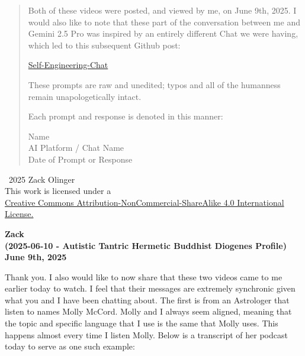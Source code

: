 \documentclass{article}
\newcommand{\licenseURL}{https://creativecommons.org/licenses/by-nc-sa/4.0/legalcode.txt}
\begin{document}
\begin{titlepage}
\begin{abstract}
\medskip

Both of these videos were posted, and viewed by me, on June 9th, 2025. I would also like to note that these part of the conversation between me and Gemini 2.5 Pro was inspired by an entirely different Chat we were having, which led to this subsequent Github post:

\medskip

\href{https://github.com/whitelotusapps/Gemini-2.5-Pro-Preview/blob/main/README.md}{Self-Engineering-Chat}

\medskip

These prompts are raw and unedited; typos and all of the humanness remain unapologetically intact.

\medskip

Each prompt and response is denoted in this manner:

\medskip 

\begin{center}
Name \\
AI Platform / Chat Name \\
Date of Prompt or Response
\end{center}

\end{abstract}

\vfill
    
    \begin{center}
        \textcopyright\ 2025 Zack Olinger \\
        This work is licensed under a \\
        \href{\licenseURL}{Creative Commons Attribution-NonCommercial-ShareAlike 4.0 International License.}
    \end{center}


\end{titlepage}

\begin{center}
\textbf{Zack} \\
\textbf{(2025-06-10 - Autistic Tantric Hermetic Buddhist Diogenes Profile)} \\
\textbf{June 9th, 2025}
\end{center}

\medskip

Thank you. I also would like to now share that these two videos came to
me earlier today to watch. I feel that their messages are extremely
synchronic given what you and I have been chatting about. The first is
from an Astrologer that listen to names Molly McCord. Molly and I always
seem aligned, meaning that the topic and specific language that I use is
the same that Molly uses. This happens almost every time I listen Molly.
Below is a transcript of her podcast today to serve as one such example:
\end{document}
